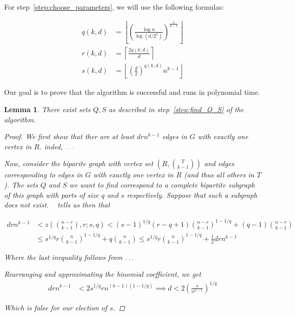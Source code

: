 \documentclass[12pt]{article}
\newtheorem{lemma}[thm]{Lemma}
\begin{document}
    For step~\ref{step:choose_parameters}, we will use the following formulas:

    \begin{align*}
            q(k, d) &= \left\lfloor \left(  \frac{\log n}{\log (d/2^k)} \right)^{\frac{1}{k-1}} \right\rfloor \\
            r(k, d) &= \left \lceil \frac{2q(k, d)}{d} \right \rceil \\
            s(k, d) &= \left\lfloor \left( \frac{d}{2} \right)^{q(k, d)} n^{k-1} \right\rfloor
    \end{align*}

    Our goal is to prove that the algorithm is successful and runs in polynomial time.

    \begin{lemma}\label{many_edges}There exist sets $Q, S$ as described in step~\ref{step:find_Q_S} of the algorithm.

        \begin{proof}
            We first show that ther are at least $drn^{k-1}$ edges in $G$ with exactly one vertex in $R$.
            inded, $\color{red}\ldots$ %

            Now, consider the biparite graph with vertex set $\left( R, \binom{T}{k-1} \right)$
            and edges corresponding to edges in $G$ with exactly one vertex in $R$ (and thus all others in $T$).
            The sets $Q$ and $S$ we want to find correspond to a complete bipartite subgraph of this graph
            with parts of size $q$ and $s$ respectively.
            Suppose that such a subgraph does not exist.
            ~\cite{Kovari1954} tells us then that

            \begin{align*}\label{eq:equation}
                drn^{k-1} & < z\left(\binom{n-r}{k-1}, r; s, q  \right) < (s-1)^{1/q}(r-q+1)\binom{n-r}{k-1}^{1-1/q} + (q-1)\binom{n-r}{k-1} \\
                           & \leq s^{1/q} r \binom{n}{k-1}^{1-1/q} + q \binom{n}{k-1} \leq s^{1/q} r \binom{n}{k-1}^{1-1/q} + \frac{1}{2} drn^{k-1}
            \end{align*}

            Where the last inequality follows from $\color{red} \ldots$

            Rearranging and approximating the binomial coefficient, we get
            \begin{align*}
                drn^{k-1} &< 2s^{1/q}r n^{(k-1)(1-1/q)} \implies d < 2 \left( \frac{s}{n^{k-1}} \right)^{1/q}
            \end{align*}

            Which is false for our election of $s$.



        \end{proof}

    \end{lemma}








    
    
\end{document}

